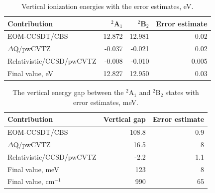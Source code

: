 \documentclass[12pt,prb,aps]{revtex4}
\begin{document}
\begin{table}[h!]
\caption{
Vertical ionization energies with the error estimates, eV.
    \label{tab:vertical_ionization_energy}}
    \begin{center}  
        \begin{tabular}[c]{|l|rr|r|}
            \hline
            Contribution  & $^2$A$_1$ & $^2$B$_2$ & Error estimate \\ \hline
            EOM-CCSDT/CBS & 12.872    & 12.981    & 0.02 \\
            $\Delta$Q/pwCVTZ & -0.037    & -0.021    & 0.02 \\
            Relativistic/CCSD/pwCVTZ  & -0.008    & -0.010    & 0.005 \\ \hline
            Final value, eV           & 12.827    & 12.950    & 0.03 \\ \hline
        \end{tabular}
    \end{center}
\end{table}

\begin{table}[h!]
    \caption{
        The vertical energy gap between the $^2$A$_1$
        and $^2$B$_2$ states with error estimates, meV. 
    \label{tab:vertical_gap}}
    \begin{center}
        \begin{tabular}[c]{|l|r|r|}
            \hline
            Contribution             &  Vertical gap    & Error estimate \\ \hline
            EOM-CCSDT/CBS            &  108.8           & 0.9 \\
            $\Delta$Q/pwCVTZ         &   16.5           & 8 \\
            Relativistic/CCSD/pwCVTZ &   -2.2           & 1.1 \\ \hline
            Final value, meV         &  123             & 8 \\
            Final value, cm$^{-1}$   &  990             & 65 \\ \hline
        \end{tabular}
    \end{center}
\end{table}
\end{document}
